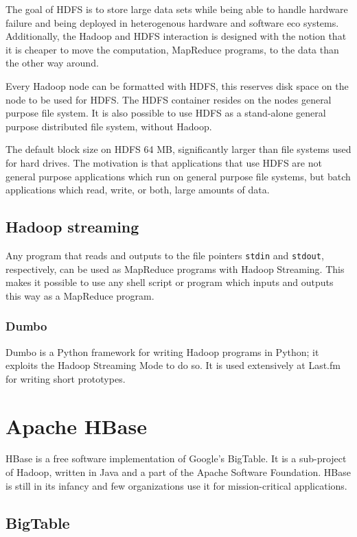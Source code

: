 The goal of HDFS is to store large data sets while being able to handle
hardware failure and being deployed in heterogenous hardware and software
eco systems. Additionally, the Hadoop and HDFS interaction is designed with
the notion that it is cheaper to move the computation, MapReduce programs,
to the data than the other way around.

Every Hadoop node can be formatted with HDFS, this reserves disk space on
the node to be used for HDFS. The HDFS container resides on the nodes
general purpose file system. It is also possible to use HDFS as a
stand-alone general purpose distributed file system, without Hadoop.

The default block size on HDFS 64 MB, significantly larger than
file systems used for hard drives. The motivation is that applications
that use HDFS are not general purpose applications which run on general
purpose file systems, but batch applications which read, write, or both,
large amounts of data.


\subsection*{Hadoop streaming}

Any program that reads and outputs to the file pointers \texttt{stdin} and
\texttt{stdout}, respectively, can be used as MapReduce programs with
Hadoop Streaming. This makes it possible to use any shell script or
program which inputs and outputs this way as a MapReduce program.


\subsubsection*{Dumbo}

Dumbo is a Python framework for writing Hadoop programs in Python; it exploits
the Hadoop Streaming Mode to do so. It is used extensively at Last.fm for
writing short prototypes. \cite{dumbo}


\section{Apache HBase}

HBase is a free software implementation of Google's BigTable. \cite{bigtable} It
is a sub-project of Hadoop, written in Java and a part of the Apache Software
Foundation. HBase is still in its infancy and few organizations use it for
mission-critical applications. \cite{hbase}


\subsection{BigTable}

